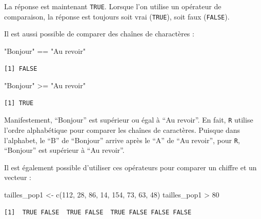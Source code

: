 \documentclass[
  letterpaper,
  DIV=11,
  numbers=noendperiod]{scrreprt}
\newenvironment{Shaded}{\begin{snugshade}}{\end{snugshade}}
\newcommand{\DecValTok}[1]{\textcolor[rgb]{0.68,0.00,0.00}{#1}}
\newcommand{\FunctionTok}[1]{\textcolor[rgb]{0.28,0.35,0.67}{#1}}
\newcommand{\NormalTok}[1]{\textcolor[rgb]{0.00,0.23,0.31}{#1}}
\newcommand{\OtherTok}[1]{\textcolor[rgb]{0.00,0.23,0.31}{#1}}
\newcommand{\SpecialCharTok}[1]{\textcolor[rgb]{0.37,0.37,0.37}{#1}}
\newcommand{\StringTok}[1]{\textcolor[rgb]{0.13,0.47,0.30}{#1}}
\begin{document}
La réponse est maintenant \texttt{TRUE}. Lorsque l'on utilise un
opérateur de comparaison, la réponse est toujours soit vrai
(\texttt{TRUE}), soit faux (\texttt{FALSE}).

Il est aussi possible de comparer des chaînes de charactères :

\begin{Shaded}
\begin{Highlighting}[]
\StringTok{"Bonjour"} \SpecialCharTok{==} \StringTok{"Au revoir"}
\end{Highlighting}
\end{Shaded}

\begin{verbatim}
[1] FALSE
\end{verbatim}

\begin{Shaded}
\begin{Highlighting}[]
\StringTok{"Bonjour"} \SpecialCharTok{\textgreater{}=} \StringTok{"Au revoir"}
\end{Highlighting}
\end{Shaded}

\begin{verbatim}
[1] TRUE
\end{verbatim}

Manifestement, ``Bonjour'' est supérieur ou égal à ``Au revoir''. En
fait, \texttt{R} utilise l'ordre alphabétique pour comparer les chaînes
de caractères. Puisque dans l'alphabet, le ``B'' de ``Bonjour'' arrive
après le ``A'' de ``Au revoir'', pour \texttt{R}, ``Bonjour'' est
supérieur à ``Au revoir''.

Il est également possible d'utiliser ces opérateurs pour comparer un
chiffre et un vecteur :

\begin{Shaded}
\begin{Highlighting}[]
\NormalTok{tailles\_pop1 }\OtherTok{\textless{}{-}} \FunctionTok{c}\NormalTok{(}\DecValTok{112}\NormalTok{, }\DecValTok{28}\NormalTok{, }\DecValTok{86}\NormalTok{, }\DecValTok{14}\NormalTok{, }\DecValTok{154}\NormalTok{, }\DecValTok{73}\NormalTok{, }\DecValTok{63}\NormalTok{, }\DecValTok{48}\NormalTok{)}
\NormalTok{tailles\_pop1 }\SpecialCharTok{\textgreater{}} \DecValTok{80}
\end{Highlighting}
\end{Shaded}

\begin{verbatim}
[1]  TRUE FALSE  TRUE FALSE  TRUE FALSE FALSE FALSE
\end{verbatim}
\end{document}
